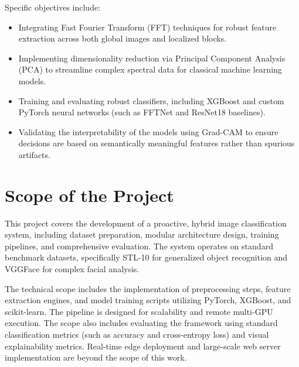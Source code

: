 Specific objectives include:
\begin{itemize}
    \item Integrating Fast Fourier Transform (FFT) techniques for robust feature extraction across both global images and localized blocks.
    \item Implementing dimensionality reduction via Principal Component Analysis (PCA) to streamline complex spectral data for classical machine learning models.
    \item Training and evaluating robust classifiers, including XGBoost and custom PyTorch neural networks (such as FFTNet and ResNet18 baselines).
    \item Validating the interpretability of the models using Grad-CAM to ensure decisions are based on semantically meaningful features rather than spurious artifacts.
\end{itemize}

\section{Scope of the Project}

This project covers the development of a proactive, hybrid image classification system, including dataset preparation, modular architecture design, training pipelines, and comprehensive evaluation. The system operates on standard benchmark datasets, specifically STL-10 for generalized object recognition and VGGFace for complex facial analysis. 

The technical scope includes the implementation of preprocessing steps, feature extraction engines, and model training scripts utilizing PyTorch, XGBoost, and scikit-learn. The pipeline is designed for scalability and remote multi-GPU execution. The scope also includes evaluating the framework using standard classification metrics (such as accuracy and cross-entropy loss) and visual explainability metrics. Real-time edge deployment and large-scale web server implementation are beyond the scope of this work.
